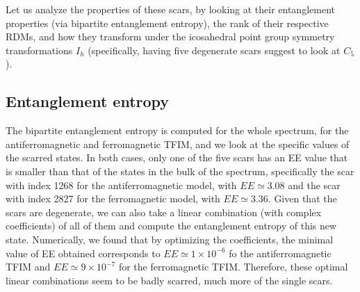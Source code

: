 \documentclass{article}
\begin{document}
Let us analyze the properties of these scars, by looking at their entanglement properties (via bipartite entanglement entropy), the rank of their respective RDMs, and how they transform under the icosahedral point group  symmetry transformations $I_h$ (specifically, having five degenerate scars suggest to look at $C_5$).\\

\subsection{Entanglement entropy}

The bipartite entanglement entropy is computed for the whole spectrum, for the antiferromagnetic and ferromagnetic TFIM, and we look at the specific values of the scarred states. In both cases, only one of the five scars has an EE value that is smaller than that of the states in the bulk of the spectrum, specifically the scar with index 1268 for the antiferromagnetic model, with $EE \simeq 3.08$ and the scar with index 2827 for the ferromagnetic model, with $EE \simeq 3.36$. Given that the scars are degenerate, we can also take a linear combination (with complex coefficients) of all of them and compute the entanglement entropy of this new state. Numerically, we found that by optimizing the coefficients, the minimal value of EE obtained corresponds to $EE \simeq 1\times10^{-6}$ fo the antiferromagnetic TFIM and $EE \simeq 9\times10^{-7}$ for the ferromagnetic TFIM. Therefore, these optimal linear combinations seem to be badly scarred, much more of the single scars.
\end{document}

